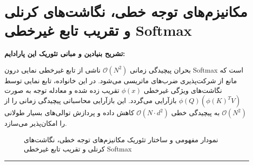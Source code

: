\section{مکانیزم‌های توجه خطی، نگاشت‌های کرنلی و تقریب تابع غیرخطی Softmax}

\textbf{تشریح بنیادین و مبانی تئوریک این پارادایم:}

بحران پیچیدگی زمانی $\mathcal{O}(N^2)$ ناشی از تابع غیرخطی نمایی درون Softmax است که مانع از شرکت‌پذیری ضرب‌های ماتریسی می‌شود. در این خانواده، تابع نمایی توسط نگاشت‌های ویژگی غیرخطی $\phi(x)$ تقریب زده شده و معادله توجه به صورت $\phi(Q) (\phi(K)^T V)$ بازآرایی می‌گردد. این بازآرایی محاسباتی پیچیدگی زمانی را از $\mathcal{O}(N^2)$ به پیچیدگی خطی $\mathcal{O}(N \cdot d^2)$ کاهش داده و پردازش توالی‌های بسیار طولانی را امکان‌پذیر می‌سازد.

\begin{figure}[H]
\centering
{}
\caption{نمودار مفهومی و ساختار تئوریک مکانیزم‌های توجه خطی، نگاشت‌های کرنلی و تقریب تابع غیرخطی Softmax}
\end{figure}

\vspace{0.4cm}
\hrule
\vspace{0.4cm}

